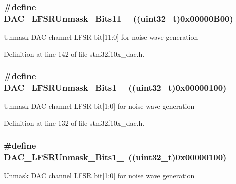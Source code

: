 \subsubsection[{\texorpdfstring{D\+A\+C\+\_\+\+L\+F\+S\+R\+Unmask\+\_\+\+Bits11\+\_\+0}{DAC_LFSRUnmask_Bits11_0}}]{\setlength{\rightskip}{0pt plus 5cm}\#define D\+A\+C\+\_\+\+L\+F\+S\+R\+Unmask\+\_\+\+Bits11\+\_~(({\bf uint32\+\_\+t})0x00000\+B00)}\hypertarget{group___d_a_c__lfsrunmask__triangleamplitude_gaeb9b5992b771f9a14587eeda58227831}{}\label{group___d_a_c__lfsrunmask__triangleamplitude_gaeb9b5992b771f9a14587eeda58227831}
Unmask D\+AC channel L\+F\+SR bit\mbox{[}11\+:0\mbox{]} for noise wave generation 

Definition at line 142 of file stm32f10x\+\_\+dac.\+h.

\subsubsection[{\texorpdfstring{D\+A\+C\+\_\+\+L\+F\+S\+R\+Unmask\+\_\+\+Bits1\+\_\+0}{DAC_LFSRUnmask_Bits1_0}}]{\setlength{\rightskip}{0pt plus 5cm}\#define D\+A\+C\+\_\+\+L\+F\+S\+R\+Unmask\+\_\+\+Bits1\+\_~(({\bf uint32\+\_\+t})0x00000100)}\hypertarget{group___d_a_c__lfsrunmask__triangleamplitude_ga09f47cfa563252a1add4662284350c07}{}\label{group___d_a_c__lfsrunmask__triangleamplitude_ga09f47cfa563252a1add4662284350c07}
Unmask D\+AC channel L\+F\+SR bit\mbox{[}1\+:0\mbox{]} for noise wave generation 

Definition at line 132 of file stm32f10x\+\_\+dac.\+h.

\subsubsection[{\texorpdfstring{D\+A\+C\+\_\+\+L\+F\+S\+R\+Unmask\+\_\+\+Bits1\+\_\+0}{DAC_LFSRUnmask_Bits1_0}}]{\setlength{\rightskip}{0pt plus 5cm}\#define D\+A\+C\+\_\+\+L\+F\+S\+R\+Unmask\+\_\+\+Bits1\+\_~(({\bf uint32\+\_\+t})0x00000100)}\hypertarget{group___d_a_c__lfsrunmask__triangleamplitude_ga09f47cfa563252a1add4662284350c07}{}\label{group___d_a_c__lfsrunmask__triangleamplitude_ga09f47cfa563252a1add4662284350c07}
Unmask D\+AC channel L\+F\+SR bit\mbox{[}1\+:0\mbox{]} for noise wave generation 

